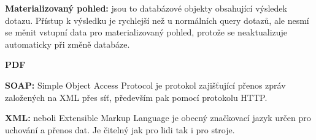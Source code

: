 \documentclass[czech,BP]{thesiskiv}
\begin{document}
\textbf{Materializovaný pohled:} jsou to databázové objekty obsahující výsledek dotazu. Přístup k výsledku je rychlejší než u normálních query dotazů, ale nesmí se měnit vstupní data pro materializovaný pohled, protože se neaktualizuje automaticky při změně databáze.

\textbf{PDF}  \citealp{PDF}

\textbf{SOAP:} Simple Object Access Protocol je protokol zajišťující přenos zpráv založených na XML přes síť, především pak pomocí protokolu HTTP.

\textbf{XML:} neboli Extensible Markup Language je obecný značkovací jazyk určen pro uchování a přenos dat. Je čitelný jak pro lidi tak i pro stroje.


{\raggedright\small

}
\end{document}
